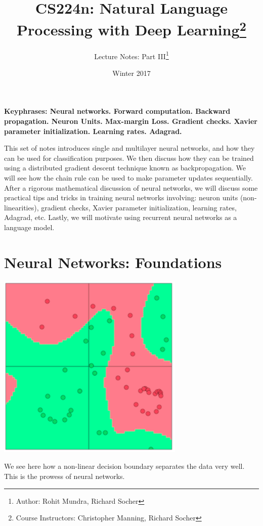 \documentclass{tufte-handout}
\title{CS224n: Natural Language Processing with Deep Learning\thanks{Course Instructors: Christopher Manning, Richard Socher}}
\author[Rohit Mundra, Richard Socher]{Lecture Notes: Part III\thanks{Author: Rohit Mundra, Richard Socher}}
\date{Winter 2017} %
\begin{document}
\maketitle%



\textbf{Keyphrases: Neural networks. Forward computation. Backward propagation. Neuron Units. Max-margin Loss. Gradient checks. Xavier parameter initialization. Learning rates. Adagrad.}

This set of notes introduces single and multilayer neural networks, and how they can be used for classification purposes. We then discuss how they can be trained using a distributed gradient descent technique known as backpropagation. We will see how the chain rule can be used to make parameter updates sequentially. After a rigorous mathematical discussion of neural networks, we will discuss some practical tips and tricks in training neural networks involving: neuron units (non-linearities), gradient checks, Xavier parameter initialization, learning rates, Adagrad, etc. Lastly, we will motivate using recurrent neural networks as a language model.

\section{Neural Networks: Foundations}\label{sec:nnets}

\begin{marginfigure}%
  \includegraphics[width=\linewidth]{NonlinearBoundary}
  \caption{We see here how a non-linear decision boundary separates the data very well. This is the prowess of neural networks.}
  \label{fig:NonlinearBoundary}
\end{marginfigure}
\end{document}
